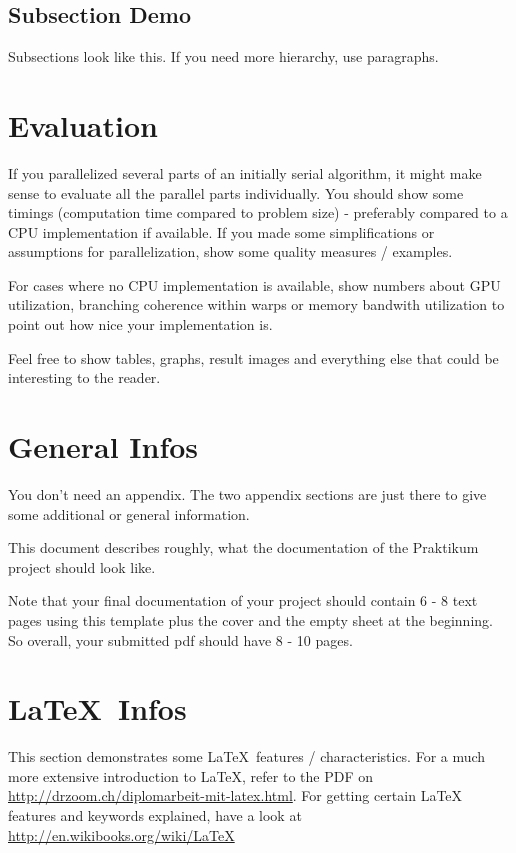 \documentclass{utue} %
\begin{document}
\subsection{Subsection Demo}

Subsections look like this. If you need more hierarchy, use paragraphs.


\section{Evaluation}

If you parallelized several parts of an initially serial algorithm, it might make sense to evaluate all the parallel parts individually. You should show some timings (computation time compared to problem size) - preferably compared to a CPU implementation if available.  If you made some simplifications or assumptions for parallelization, show some quality measures / examples.

For cases where no CPU implementation is available, show numbers about GPU utilization, branching coherence within warps or memory bandwith utilization to point out how nice your implementation is.

Feel free to show tables, graphs, result images and everything else that could be interesting to the reader.

\appendix

\section{General Infos}

You don't need an appendix. The two appendix sections are just there to give some additional or general information.

This document describes roughly, what the documentation of the Praktikum project should look like.

Note that your final documentation of your project should contain 6 - 8 text pages using this template plus the cover and the empty sheet at the beginning. So overall, your submitted pdf should have 8 - 10 pages.

\section{\LaTeX~Infos}

This section demonstrates some \LaTeX~features / characteristics. For a much more extensive introduction to \LaTeX, refer to the PDF on \url{http://drzoom.ch/diplomarbeit-mit-latex.html}. For getting certain LaTeX features and keywords explained, have a look at \url{http://en.wikibooks.org/wiki/LaTeX}
\end{document}
